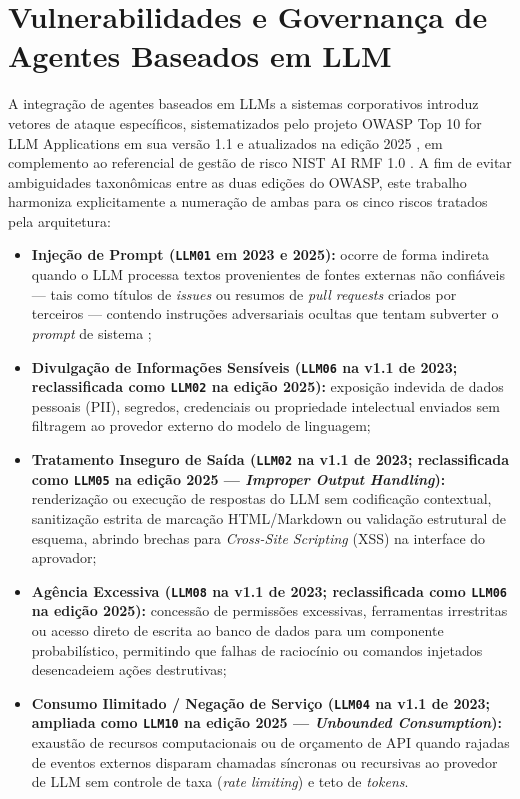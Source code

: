 \documentclass[12pt,openany,oneside,a4paper,english,brazilian,sumario=tradicional]{abntex2}
\begin{document}
\section{Vulnerabilidades e Governança de Agentes Baseados em LLM}\label{sec:owasp}

A integração de agentes baseados em LLMs a sistemas corporativos introduz vetores de ataque específicos, sistematizados pelo projeto OWASP Top 10 for LLM Applications em sua versão 1.1 \cite{owasp2023} e atualizados na edição 2025 \cite{owasp2025}, em complemento ao referencial de gestão de risco NIST AI RMF 1.0 \cite{nist2023}. A fim de evitar ambiguidades taxonômicas entre as duas edições do OWASP, este trabalho harmoniza explicitamente a numeração de ambas para os cinco riscos tratados pela arquitetura:

\begin{itemize}
  \item \textbf{Injeção de Prompt (\texttt{LLM01} em 2023 e 2025):} ocorre de forma indireta quando o LLM processa textos provenientes de fontes externas não confiáveis --- tais como títulos de \textit{issues} ou resumos de \textit{pull requests} criados por terceiros --- contendo instruções adversariais ocultas que tentam subverter o \textit{prompt} de sistema \cite{greshake2023,debenedetti2024};
  \item \textbf{Divulgação de Informações Sensíveis (\texttt{LLM06} na v1.1 de 2023; reclassificada como \texttt{LLM02} na edição 2025):} exposição indevida de dados pessoais (PII), segredos, credenciais ou propriedade intelectual enviados sem filtragem ao provedor externo do modelo de linguagem;
  \item \textbf{Tratamento Inseguro de Saída (\texttt{LLM02} na v1.1 de 2023; reclassificada como \texttt{LLM05} na edição 2025 --- \textit{Improper Output Handling}):} renderização ou execução de respostas do LLM sem codificação contextual, sanitização estrita de marcação HTML/Markdown ou validação estrutural de esquema, abrindo brechas para \textit{Cross-Site Scripting} (XSS) na interface do aprovador;
  \item \textbf{Agência Excessiva (\texttt{LLM08} na v1.1 de 2023; reclassificada como \texttt{LLM06} na edição 2025):} concessão de permissões excessivas, ferramentas irrestritas ou acesso direto de escrita ao banco de dados para um componente probabilístico, permitindo que falhas de raciocínio ou comandos injetados desencadeiem ações destrutivas;
  \item \textbf{Consumo Ilimitado / Negação de Serviço (\texttt{LLM04} na v1.1 de 2023; ampliada como \texttt{LLM10} na edição 2025 --- \textit{Unbounded Consumption}):} exaustão de recursos computacionais ou de orçamento de API quando rajadas de eventos externos disparam chamadas síncronas ou recursivas ao provedor de LLM sem controle de taxa (\textit{rate limiting}) e teto de \textit{tokens}.
\end{itemize}
\end{document}
